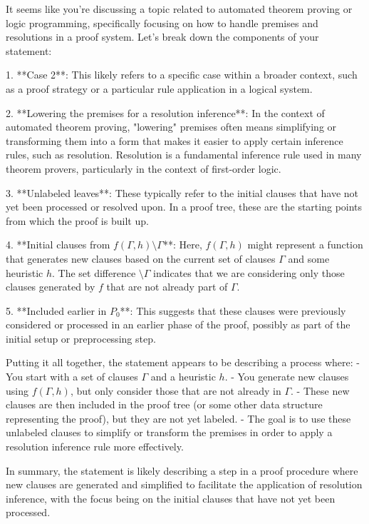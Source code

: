 It seems like you're discussing a topic related to automated theorem proving or logic programming, specifically focusing on how to handle premises and resolutions in a proof system. Let's break down the components of your statement:

1. **Case 2**: This likely refers to a specific case within a broader context, such as a proof strategy or a particular rule application in a logical system.

2. **Lowering the premises for a resolution inference**: In the context of automated theorem proving, "lowering" premises often means simplifying or transforming them into a form that makes it easier to apply certain inference rules, such as resolution. Resolution is a fundamental inference rule used in many theorem provers, particularly in the context of first-order logic.

3. **Unlabeled leaves**: These typically refer to the initial clauses that have not yet been processed or resolved upon. In a proof tree, these are the starting points from which the proof is built up.

4. **Initial clauses from \( f(\Gamma, h) \setminus \Gamma \)**: Here, \( f(\Gamma, h) \) might represent a function that generates new clauses based on the current set of clauses \(\Gamma\) and some heuristic \(h\). The set difference \( \setminus \Gamma \) indicates that we are considering only those clauses generated by \( f \) that are not already part of \(\Gamma\).

5. **Included earlier in \( P_0 \)**: This suggests that these clauses were previously considered or processed in an earlier phase of the proof, possibly as part of the initial setup or preprocessing step.

Putting it all together, the statement appears to be describing a process where:
- You start with a set of clauses \(\Gamma\) and a heuristic \(h\).
- You generate new clauses using \( f(\Gamma, h) \), but only consider those that are not already in \(\Gamma\).
- These new clauses are then included in the proof tree (or some other data structure representing the proof), but they are not yet labeled.
- The goal is to use these unlabeled clauses to simplify or transform the premises in order to apply a resolution inference rule more effectively.

In summary, the statement is likely describing a step in a proof procedure where new clauses are generated and simplified to facilitate the application of resolution inference, with the focus being on the initial clauses that have not yet been processed.